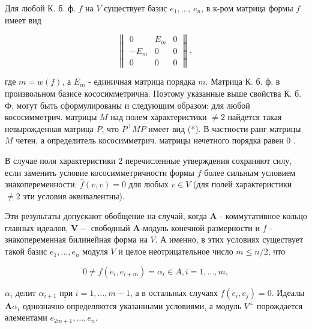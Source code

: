 \documentclass[10pt]{article}
\begin{document}
Для любой К. б. ф. $f$ на $V$ существует базис $e_{1}, \ldots$, $e_{n}$, в к-ром матрица формы $f$ имеет вид



\[

\left\|\begin{array}{ccc}

0 & E_{m} & 0 \\

-E_{m} & 0 & 0 \\

0 & 0 & 0

\end{array}\right\| \text {, }

\]



где $m=w(f)$, а $E_{m}$ - единичная матрица порядка $m$. Матрица $К$. б. ф. в произвольном базисе кососимметрична. Поэтому указанные выше свойства К. б. Ф. могут быть сформулированы и следующим образом: для любой кососимметрич. матрицы $M$ над полем характеристики $\neq 2$ найдется такая невырожденная матрица $P$, что $P^{\top} M P$ имеет вид (*). В частности ранг матрицы $M$ четен, а определитель кососимметрич. матрицы нечетного порядка равен 0 .



В случае поля характеристики 2 перечисленные утверждения сохраняют силу, если заменить условие кососимметричности формы $f$ более сильным условием знакопеременности: $\hat{f}(v, v)=0$ для любых $v \in V$ (для полей характеристики $\neq 2$ эти условия әквивалентны).



Эти результаты допускают обобщение на случай, когда $\boldsymbol{A}$ - коммутативное кольцо главных идеалов, $\boldsymbol{V}-$ свободный $\boldsymbol{A}$-модуль конечной размерности и $f$ - знакопеременная билинейная форма на $V$. А именно, в этих условиях существует такой базис $e_{1}, \ldots, e_{n}$ модуля $V$ и целое неотрицательное число $m \leqslant n / 2$, что



\[

0 \neq f\left(e_{i}, e_{i+m}\right)=\alpha_{i} \in A, i=1, \ldots, m,

\]



$\alpha_{i}$ делит $\alpha_{i+1}$ при $i=1, \ldots, m-1$, а в остальных случаях $f\left(e_{i}, e_{j}\right)=0$. Идеалы $\boldsymbol{A} \alpha_{i}$ однозначно определяются указанными условиями, а модуль $V^{\perp}$ порождается әлементами $e_{2 m+1}, \ldots, e_{n}$.
\end{document}
